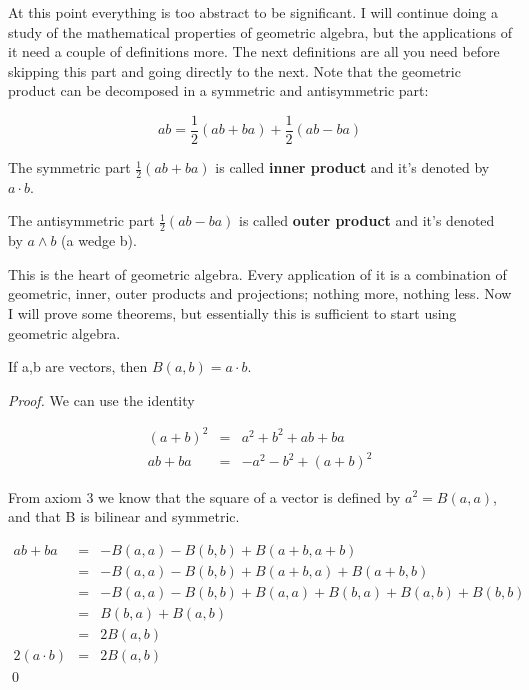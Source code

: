At this point everything is too abstract to be significant. I will continue doing a study of the mathematical properties of geometric algebra, but the applications of it need a couple of definitions more. The next definitions are all you need before skipping this part and going directly to the next. Note that the geometric product can be decomposed in a symmetric and antisymmetric part:

\begin{equation}
ab=\frac{1}{2} (ab + ba) + \frac{1}{2} (ab - ba)
\end{equation}

\begin{definition}
The symmetric part $\frac{1}{2} (ab + ba)$ is called \textbf{inner product} and it's denoted by $a \cdot b$.
\end{definition}

\begin{definition}
The antisymmetric part $\frac{1}{2} (ab - ba)$ is called \textbf{outer product} and it's denoted by $a \wedge b$ (a wedge b).
\end{definition}

This is the heart of geometric algebra. Every application of it is a combination of geometric, inner, outer products and projections; nothing more, nothing less. Now I will prove some theorems, but essentially this is sufficient to start using geometric algebra.

\begin{theorem}
\label{InnerProductBilinearFormEquivalence}
If a,b are vectors, then $B(a,b) = a \cdot b$.
\end{theorem}

\begin{proof}
We can use the identity

\begin{eqnarray*}
(a+b)^2 & = & a^2 + b^2 + ab + ba \\
ab + ba & = & - a^2 - b^2 + (a+b)^2
\end{eqnarray*}

From axiom 3 we know that the square of a vector is defined by $a^2 = B(a,a)$, and that B is bilinear and symmetric.

\begin{eqnarray*}
ab+ba &=& - B(a,a) - B(b,b) + B(a+b,a+b) \\
& = & - B(a,a) - B(b,b) + B(a+b,a) + B(a+b,b) \\
& = & - B(a,a) - B(b,b) + B(a,a) + B(b,a) + B(a,b) + B(b,b) \\
& = & B(b,a) + B(a,b) \\
& = & 2 B(a,b) \\
2 (a \cdot b) & = & 2 B(a,b)
\end{eqnarray*}
\qed
\end{proof}


